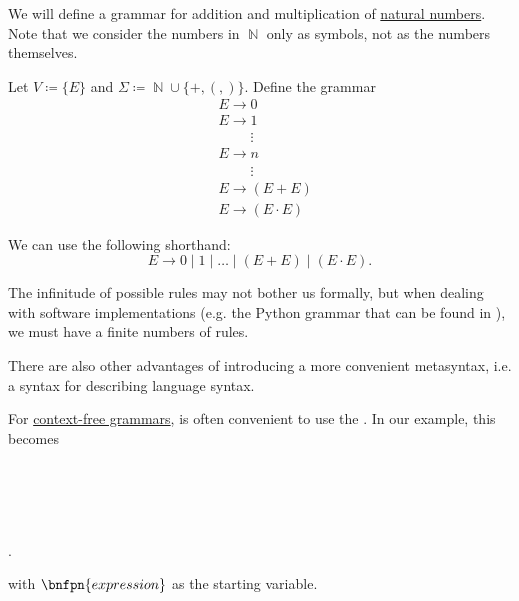 \begin{example}\label{ex:natural_arithmetic_grammar/backus_naur_form}
  We will define a grammar for addition and multiplication of \hyperref[def:natural_numbers]{natural numbers}. Note that we consider the numbers in \( \BbbN \) only as symbols, not as the numbers themselves.

  Let \( V \coloneqq \{ E \} \) and \( \Sigma \coloneqq \BbbN \cup \{ +, (, ) \} \). Define the grammar
  \begin{equation}\label{eq:ex:natural_arithmetic_grammar/backus_naur_form/simple}
    \begin{aligned}
      &E \to 0 \\
      &E \to 1 \\
      &\phantom{E \to} \vdots \\
      &E \to n \\
      &\phantom{E \to} \vdots \\
      &E \to (E + E) \\
      &E \to (E \cdot E)
    \end{aligned}
  \end{equation}

  We can use the following shorthand:
  \begin{equation}\label{eq:ex:natural_arithmetic_grammar/backus_naur_form/shorthand}
    E \to 0 \mid 1 \mid \ldots \mid (E + E) \mid (E \cdot E).
  \end{equation}

  The infinitude of possible rules may not bother us formally, but when dealing with software implementations (e.g. the Python grammar that can be found in \cite{Python39Grammar}), we must have a finite numbers of rules.

  There are also other advantages of introducing a more convenient metasyntax, i.e. a syntax for describing language syntax.

  For \hyperref[def:grammar/context_free]{context-free grammars}, is often convenient to use the . In our example, this becomes
  \begin{bnf*}
     { \bnfor {} \bnfor {} \bnfor {} \bnfor {} \bnfor {} \bnfor {} \bnfor {} \bnfor {}} \\
             { \bnfor {}} \\
            { \bnfor {} \bnfsp {}} \\
         {\bnfts{+} \bnfor \bnfts{\( \cdot \)}} \\
        { \bnfor \bnfts{(} \bnfsp {} \bnfsp {} \bnfsp {} \bnfsp \bnfts{)}}.
  \end{bnf*}
  with \( \bnfpn{expression} \) as the starting variable.


\end{example}
